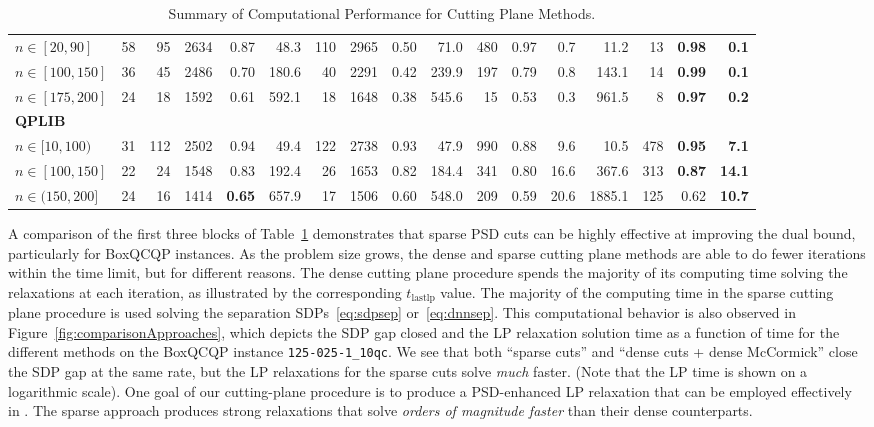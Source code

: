 \documentclass[twoside]{article}
\begin{document}
\begin{table}[ht]
{\begin{tabular}{lc|rrrr|rrrr|rrr|rrrr}
					\addlinespace[2pt]
					$n \in [20,90]$ & 58 & 95 & 2634 & 0.87 & 48.3 & 110 & 2965 & 0.50 & 71.0 & 480 & 0.97 & 0.7 & 11.2 & 13 & \textbf{0.98} & \textbf{0.1} \\
					$n \in [100, 150]$ & 36 & 45 & 2486 & 0.70 & 180.6 & 40 & 2291 & 0.42 & 239.9 & 197 & 0.79 & 0.8 & 143.1 & 14 & \textbf{0.99} & \textbf{0.1} \\
					$n \in [175, 200]$ & 24 & 18 & 1592 & 0.61 & 592.1 & 18 & 1648 & 0.38 & 545.6 & 15 & 0.53 & 0.3 & 961.5 & 8 & \textbf{0.97} & \textbf{0.2} \\
					\midrule
					\multicolumn{15}{l}{\textbf{QPLIB}}\\
					\addlinespace[2pt]
					$n \in [10, 100)$ & 31 & 112 & 2502 & 0.94 & 49.4 & 122 & 2738 & 0.93 & 47.9 & 990 & 0.88 & 9.6 & 10.5 & 478 & \textbf{0.95} & \textbf{7.1} \\
					$n \in [100, 150]$& 22 & 24 & 1548 & 0.83 & 192.4 & 26 & 1653 & 0.82 & 184.4 & 341 & 0.80 & 16.6 & 367.6 & 313 & \textbf{0.87} & \textbf{14.1} \\
					$n \in (150, 200]$ & 24 & 16 & 1414 & \textbf{0.65} & 657.9 & 17 & 1506 & 0.60 & 548.0 & 209 & 0.59 & 20.6 & 1885.1 & 125 & 0.62 & \textbf{10.7} \\
					\bottomrule
			\end{tabular}}
			\caption{Summary of Computational Performance for Cutting Plane Methods.}
		\label{tab:bounds}
	\end{table}
	
	
	A comparison of the first three blocks of Table~\ref{tab:bounds} demonstrates that sparse PSD cuts can be highly effective at improving the dual bound, particularly for BoxQCQP instances.  As the problem size grows, the dense and sparse cutting plane methods are able to do fewer iterations within the time limit, but for different reasons.  The dense cutting plane procedure spends the majority of its computing time solving the \LP relaxations at each iteration, as illustrated by the corresponding $t_{\text{lastlp}}$ value.  The majority of the computing time in the sparse cutting plane procedure is used solving the separation SDPs~\eqref{eq:sdpsep} or~\eqref{eq:dnnsep}.
	This computational behavior is also observed in Figure~\ref{fig:comparisonApproaches}, which depicts the SDP gap closed and the LP relaxation solution time as a function of time for the different methods on the BoxQCQP instance \texttt{125-025-1\_10qc}.
	We see that both ``sparse cuts'' and ``dense cuts + dense McCormick'' close the SDP gap at the same rate, but the LP relaxations for the sparse cuts solve \emph{much} faster.  (Note that the LP time is shown on a logarithmic scale).
	One goal of our cutting-plane procedure is to produce a PSD-enhanced LP relaxation that can be employed effectively in \BnBx. The sparse approach produces strong relaxations that solve \emph{orders of magnitude faster} than their dense counterparts. 
	
\end{document}
